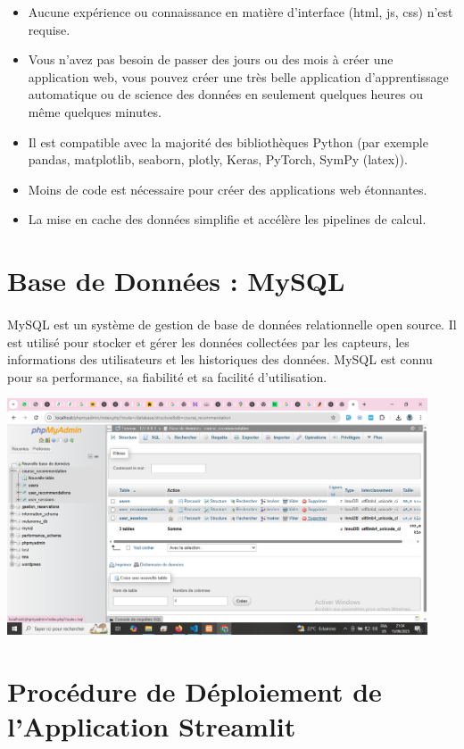\begin{itemize}
    \item Aucune expérience ou connaissance en matière d'interface (html, js, css) n'est requise.
    \item Vous n'avez pas besoin de passer des jours ou des mois à créer une application web, vous pouvez créer une très belle application d'apprentissage automatique ou de science des données en seulement quelques heures ou même quelques minutes.
    \item Il est compatible avec la majorité des bibliothèques Python (par exemple pandas, matplotlib, seaborn, plotly, Keras, PyTorch, SymPy (latex)).
    \item Moins de code est nécessaire pour créer des applications web étonnantes.
    \item La mise en cache des données simplifie et accélère les pipelines de calcul.
\end{itemize}

\section{Base de Données : MySQL}
\paragraph{}
MySQL est un système de gestion de base de données relationnelle open source. Il est utilisé pour stocker et gérer les données collectées par les capteurs, les informations des utilisateurs et les historiques des données. MySQL est connu pour sa performance, sa fiabilité et sa facilité d'utilisation.

 \includegraphics[width=\linewidth, height=7cm]{images/Capture d’écran (200).png}
\newpage
 \section{Procédure de Déploiement de l'Application Streamlit}

